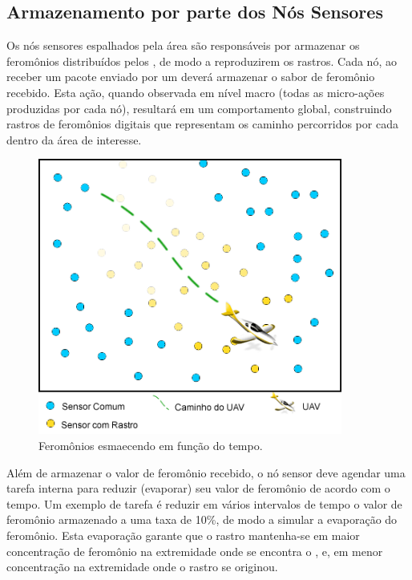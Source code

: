 \subsection{Armazenamento por parte dos Nós Sensores}
Os nós sensores espalhados pela área são responsáveis por armazenar os feromônios distribuídos pelos \vants, de modo a reproduzirem os rastros. Cada nó, ao receber um pacote enviado por um \vant deverá armazenar o sabor de feromônio recebido. Esta ação, quando observada em nível macro (todas as micro-ações produzidas por cada nó), resultará em um comportamento global, construindo rastros de feromônios digitais que representam os caminho percorridos por cada \vant dentro da área de interesse. 

 \begin{figure}[h!]
 \centering
 \includegraphics[width=10cm]{pictures/flat_pheromone.png}
 \caption{Feromônios esmaecendo em função do tempo.}
  \label{fig:flat}
 \end{figure}

Além de armazenar o valor de feromônio recebido, o nó sensor deve agendar uma tarefa interna para reduzir (evaporar) seu valor de feromônio de acordo com o tempo. Um exemplo de tarefa é reduzir em vários intervalos de tempo o valor de feromônio armazenado a uma taxa de 10\%, de modo a simular a evaporação do feromônio. 
Esta evaporação garante que o rastro mantenha-se em maior concentração de feromônio na extremidade onde se encontra o \vant, e, em menor concentração na extremidade onde o rastro se originou.



